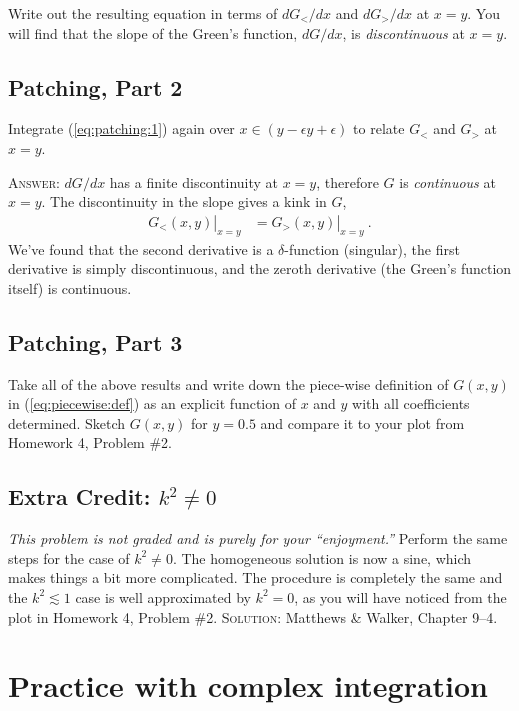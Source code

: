 \documentclass[12pt]{article}
\numberwithin{equation}{section}    %
\begin{document}
Write out the resulting equation in terms of $dG_</dx$ and $dG_>/dx$ at $x=y$. You will find that the slope of the Green's function, $dG/dx$, is \emph{discontinuous} at $x=y$. 


\subsection{Patching, Part 2}

Integrate (\ref{eq:patching:1}) again over $x\in(y-\epsilon y+\epsilon)$ to relate $G_<$ and $G_>$ at $x=y$.


\textsc{Answer}: $dG/dx$ has a finite discontinuity at $x=y$, therefore $G$ is \emph{continuous} at $x=y$. The discontinuity in the slope gives a kink in $G$,
\begin{align}
	\left.G_<(x, y)\right|_{x=y} &= \left.G_>(x, y)\right|_{x=y} \ .
\end{align}
We've found that the second derivative is a $\delta$-function (singular), the first derivative is simply discontinuous, and the zeroth derivative (the Green's function itself) is continuous.

\subsection{Patching, Part 3}

Take all of the above results and write down the piece-wise definition of $G(x,y)$ in (\ref{eq:piecewise:def}) as an explicit function of $x$ and $y$ with all coefficients determined. Sketch $G(x,y)$  for $y=0.5$ and compare it to your plot from Homework 4, Problem \#2.

\subsection{Extra Credit: $k^2\neq 0$}

\emph{This problem is not graded and is purely for your ``enjoyment.''} Perform the same steps for the case of $k^2\neq 0$. The homogeneous solution is now a sine, which makes things a bit more complicated. The procedure is completely the same and the $k^2 \lesssim 1$ case is well approximated by $k^2=0$, as you will have noticed from the plot in Homework 4, Problem \#2. \textsc{Solution}: Matthews \& Walker, Chapter 9--4. 

\section{Practice with complex integration}
\end{document}
